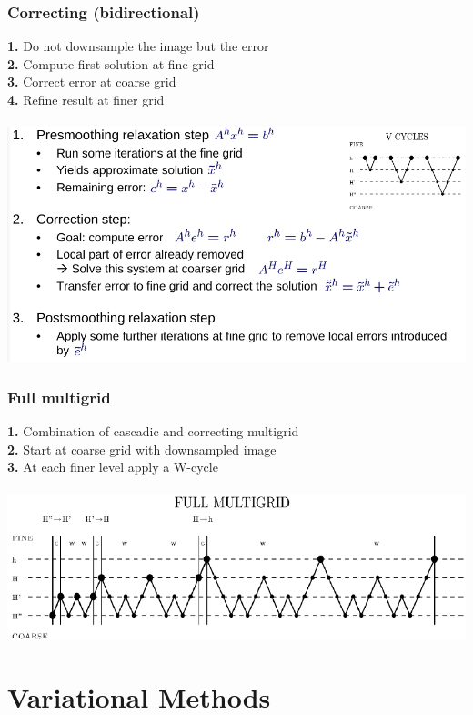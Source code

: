 \documentclass{article}
\begin{document}
\subsubsection{Correcting (bidirectional)}
\textbf{1.} Do not downsample the image but the error\\
\textbf{2.} Compute first solution at fine grid\\
\textbf{3.} Correct error at coarse grid\\
\textbf{4.} Refine result at finer grid\\\\
\includegraphics[scale=0.3]{36.png}\\
\subsubsection{Full multigrid}
\textbf{1.} Combination of cascadic and correcting multigrid\\
\textbf{2.} Start at coarse grid with downsampled image\\
\textbf{3.} At each finer level apply a W-cycle\\\\
\includegraphics[scale=0.3]{37.png}\\

\section{Variational Methods}
\end{document}
